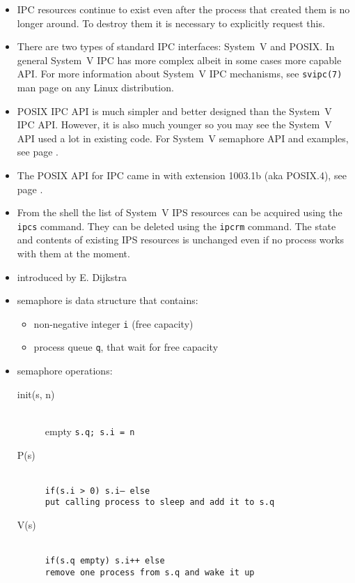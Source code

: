 \begin{itemize}
\item IPC resources continue to exist even after the process that created them
is no longer around. To destroy them it is necessary to explicitly request this.
\item There are two types of standard IPC interfaces: System~V and POSIX.
In general System~V IPC has more complex albeit in some cases more capable API.
For more information about System~V IPC mechanisms, see \texttt{svipc(7)} man
page on any Linux distribution.
\item POSIX IPC API is much simpler and better designed than the System~V IPC
API.  However, it is also much younger so you may see the System~V API used a
lot in existing code.  For System~V semaphore API and examples, see page
\pageref{SYSVSEM}.
\item The POSIX API for IPC came in with extension 1003.1b (aka POSIX.4), see
page \pageref{POSIX4}.
\item From the shell the list of System~V IPS resources can be acquired using
the \texttt{ipcs} command. They can be deleted using the \texttt{ipcrm} command.
The state and contents of existing IPS resources is unchanged even if no process
works with them at the moment.
\end{itemize}


\begin{slide}
\begin{itemize}
\item introduced by E. Dijkstra
\item semaphore is data structure that contains:
    \begin{itemize}
    \item non-negative integer \texttt{i} (free capacity)
    \item process queue \texttt{q}, that wait for free capacity
    \end{itemize}
\item semaphore operations:
    \begin{description}
    \item [init(s, n)]~\\
    empty \texttt{s.q; s.i = n}
    \item [P(s)]~\\
    \texttt{if(s.i > 0) s.i-- else\\
    put calling process to sleep and add it to s.q }
    \item [V(s)]~\\
    \texttt{if(s.q empty) s.i++ else\\
    remove one process from s.q and wake it up}
    \end{description}
\end{itemize}
\end{slide}

